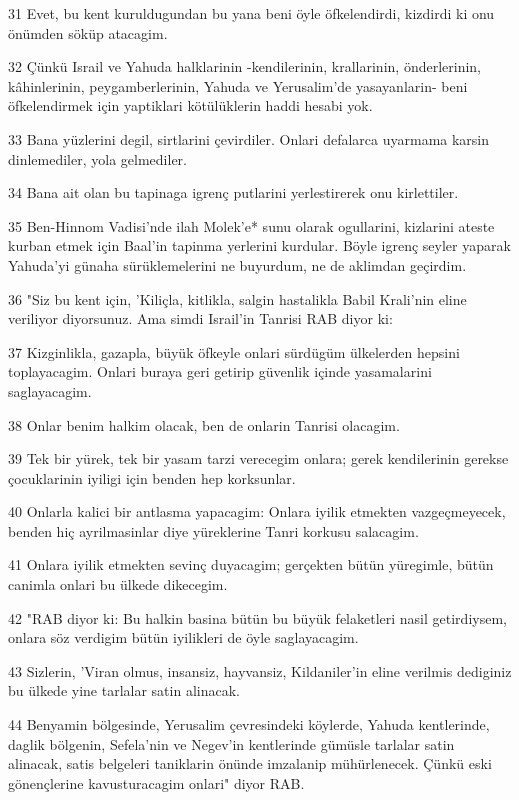 \par 31 Evet, bu kent kuruldugundan bu yana beni öyle öfkelendirdi, kizdirdi ki onu önümden söküp atacagim.
\par 32 Çünkü Israil ve Yahuda halklarinin -kendilerinin, krallarinin, önderlerinin, kâhinlerinin, peygamberlerinin, Yahuda ve Yerusalim'de yasayanlarin- beni öfkelendirmek için yaptiklari kötülüklerin haddi hesabi yok.
\par 33 Bana yüzlerini degil, sirtlarini çevirdiler. Onlari defalarca uyarmama karsin dinlemediler, yola gelmediler.
\par 34 Bana ait olan bu tapinaga igrenç putlarini yerlestirerek onu kirlettiler.
\par 35 Ben-Hinnom Vadisi'nde ilah Molek'e* sunu olarak ogullarini, kizlarini ateste kurban etmek için Baal'in tapinma yerlerini kurdular. Böyle igrenç seyler yaparak Yahuda'yi günaha sürüklemelerini ne buyurdum, ne de aklimdan geçirdim.
\par 36 "Siz bu kent için, 'Kiliçla, kitlikla, salgin hastalikla Babil Krali'nin eline veriliyor diyorsunuz. Ama simdi Israil'in Tanrisi RAB diyor ki:
\par 37 Kizginlikla, gazapla, büyük öfkeyle onlari sürdügüm ülkelerden hepsini toplayacagim. Onlari buraya geri getirip güvenlik içinde yasamalarini saglayacagim.
\par 38 Onlar benim halkim olacak, ben de onlarin Tanrisi olacagim.
\par 39 Tek bir yürek, tek bir yasam tarzi verecegim onlara; gerek kendilerinin gerekse çocuklarinin iyiligi için benden hep korksunlar.
\par 40 Onlarla kalici bir antlasma yapacagim: Onlara iyilik etmekten vazgeçmeyecek, benden hiç ayrilmasinlar diye yüreklerine Tanri korkusu salacagim.
\par 41 Onlara iyilik etmekten sevinç duyacagim; gerçekten bütün yüregimle, bütün canimla onlari bu ülkede dikecegim.
\par 42 "RAB diyor ki: Bu halkin basina bütün bu büyük felaketleri nasil getirdiysem, onlara söz verdigim bütün iyilikleri de öyle saglayacagim.
\par 43 Sizlerin, 'Viran olmus, insansiz, hayvansiz, Kildaniler'in eline verilmis dediginiz bu ülkede yine tarlalar satin alinacak.
\par 44 Benyamin bölgesinde, Yerusalim çevresindeki köylerde, Yahuda kentlerinde, daglik bölgenin, Sefela'nin ve Negev'in kentlerinde gümüsle tarlalar satin alinacak, satis belgeleri taniklarin önünde imzalanip mühürlenecek. Çünkü eski gönençlerine kavusturacagim onlari" diyor RAB.

